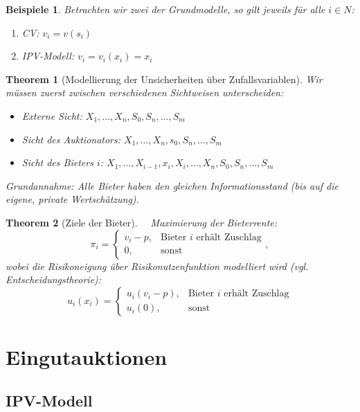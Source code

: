 \documentclass[12pt]{extreport} %
\theoremstyle{named}
\newtheorem{unnamedtheorem}{Theorem} \counterwithin{unnamedtheorem}{chapter}
\theoremstyle{itshape}
\theoremstyle{normal}
\newtheorem*{beispiele}{Beispiele}
\begin{document}
\begin{beispiele}
	Betrachten wir zwei der Grundmodelle, so gilt jeweils für alle $i \in N$:
	\begin{enumerate}
		\item CV: $v_{i} = v(s_{i})$
		\item IPV-Modell: $v_{i} = v_{i}(x_{i}) = x_{i}$
	\end{enumerate}	
\end{beispiele}

\begin{unnamedtheorem}[Modellierung der Unsicherheiten über Zufallsvariablen]
	Wir müssen zuerst zwischen verschiedenen Sichtweisen unterscheiden:
	\begin{itemize}
		\item Externe Sicht: $X_{1}, \dotsc, X_{n}, S_{0}, S_{n}, \dotsc, S_{m}$
		\item Sicht des Auktionators: $X_{1}, \dotsc, X_{n}, s_{0}, S_{n}, \dotsc, S_{m}$
		\item Sicht des Bieters $i$:  $X_{1}, \dotsc, X_{i-1}, x_{i}, X_{i}, \dotsc, X_{n}, S_{0}, S_{n}, \dotsc, S_{m}$
	\end{itemize}
	Grundannahme: Alle Bieter haben den gleichen Informationsstand (bis auf die eigene, private Wertschätzung).
\end{unnamedtheorem}

\newpage

\begin{unnamedtheorem}[Ziele der Bieter] ~\
		Maximierung der Bieterrente:
		$$ \pi_{i} = \begin{cases} v_{i} - p, & \text{Bieter $i$ erhält Zuschlag} \\ 0, & \text{sonst} \end{cases},$$
		wobei die  Risikoneigung über Risikonutzenfunktion modelliert wird (vgl. Entscheidungstheorie):
		$$ u_{i}(x_{i}) = \begin{cases} u_{i}(v_{i}-p), & \text{Bieter $i$ erhält Zuschlag} \\ u_{i}(0), & \text{sonst} \end{cases} $$ 
\end{unnamedtheorem}

\chapter{Eingutauktionen}

\section{IPV-Modell}
\end{document}
